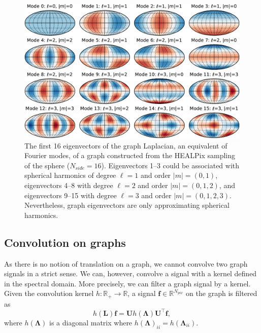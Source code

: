 \documentclass[final,twocolumn,3p,times,sort&compress]{elsarticle}
\renewcommand{\b}[1]{{\bm{#1}}}   %
\newcommand{\1}{\b{1}}              %
\newcommand{\0}{\b{0}}              %
\renewcommand{\L}{\b{L}}
\newcommand{\U}{\b{U}}
\newcommand{\f}{\b{f}}
\newcommand{\trans}{^\intercal}
\newcommand{\R}{\mathbb{R}}
\newcommand{\bLambda}{\b{\Lambda}}
\begin{document}
\begin{figure}[t!]
	\centering
	\includegraphics[width=\linewidth]{eigenvectors}
	\caption{The first 16 eigenvectors of the graph Laplacian, an equivalent of Fourier modes, of a graph constructed from the HEALPix sampling of the sphere ($N_{side}=16$).
    Eigenvectors 1--3 could be associated with spherical harmonics of degree $\ell=1$ and order $|m|=(0,1)$, eigenvectors 4--8 with degree $\ell=2$ and order $|m|=(0,1,2)$, and eigenvectors 9--15 with degree $\ell=3$ and order $|m|=(0,1,2,3)$.
    Nevertheless, graph eigenvectors are only approximating spherical harmonics.}
	\label{fig:graph_harmonics}
\end{figure}

\subsection{Convolution on graphs}
\label{sec:graph_convolution}

As there is no notion of translation on a graph, we cannot convolve two graph signals in a strict sense.
We can, however, convolve a signal with a kernel defined in the spectral domain.
More precisely, we can filter a graph signal by a kernel.
Given the convolution kernel
$h: \R_+ \rightarrow \R$, a signal $\f \in \R^{N_{pix}}$ on the graph is filtered as
\begin{equation} \label{eqn:graph_convolution_fourier}
	h(\L) \f = \U h(\bLambda) \U\trans \f,
\end{equation}
where $h(\bLambda)$ is a diagonal matrix where $h(\bLambda)_{ii} = h(\bLambda_{ii})$.
\end{document}
